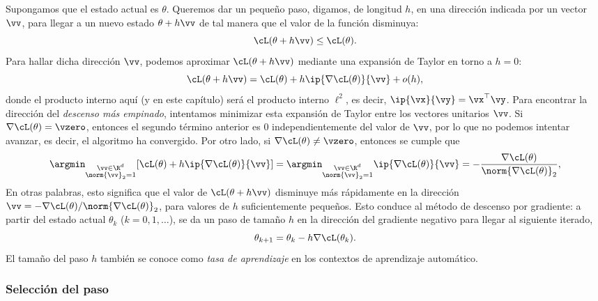\documentclass[../../book-main_es.tex]{subfiles}
\begin{document}
Supongamos que el estado actual es \(\theta\). Queremos dar un pequeño
paso, digamos, de longitud \(h\), en una dirección indicada por un vector
\(\vv\), para llegar a un nuevo estado \(\theta + h\vv\) de tal manera que el valor
de la función disminuya:
\begin{equation}
    \cL(\theta + h\vv) \leq \cL(\theta).
\end{equation}
Para hallar dicha dirección $\vv$, podemos aproximar $\cL(\theta +
h\vv)$ mediante una expansión de Taylor en torno a \(h = 0\):
\begin{equation}
    \cL(\theta + h\vv) = \cL(\theta) + h\ip{\nabla \cL(\theta)}{\vv} + o(h),
\end{equation}
donde el producto interno aquí (y en este capítulo) será el
producto interno \(\ell^{2}\), es decir, \(\ip{\vx}{\vy} = \vx^{\top}\vy\).
Para encontrar la dirección del \textit{descenso más empinado}, intentamos
minimizar esta expansión de Taylor entre los vectores unitarios \(\vv\). Si
\(\nabla \cL(\theta) = \vzero\), entonces el segundo término anterior es \(0\)
independientemente del valor de \(\vv\), por lo que no podemos intentar
avanzar, es decir, el algoritmo ha convergido. Por otro lado, si
\(\nabla \cL(\theta) \neq \vzero\), entonces se cumple que
\begin{equation}\label{eq:steepest_descent_l2_norm}
    \argmin_{\substack{\vv \in \R^{d} \\ \norm{\vv}_{2} = 1}}
    [\cL(\theta) + h\ip{\nabla \cL(\theta)}{\vv}] =
    \argmin_{\substack{\vv \in \R^{d} \\ \norm{\vv}_{2} = 1}}
    \ip{\nabla \cL(\theta)}{\vv} = -\frac{\nabla
    \cL(\theta)}{\norm{\nabla \cL(\theta)}_{2}},
\end{equation}
En otras palabras, esto significa que el valor de \(\cL(\theta + h\vv)\)
disminuye más rápidamente en la dirección \(\vv = -\nabla \cL(\theta)
/ \norm{\nabla \cL(\theta)}_{2}\), para valores de \(h\) suficientemente pequeños. Esto conduce
al método de descenso por gradiente: a partir del estado actual \(\theta_{k}\)
(\(k=0, 1, \ldots\)), se da un paso de tamaño \(h\) en la dirección
del gradiente negativo para llegar al siguiente iterado,
\begin{equation}
    \theta_{k+1} = \theta_{k} - h \nabla \cL(\theta_{k}).
\end{equation}
El tamaño del paso \(h\) también se conoce como \textit{tasa de aprendizaje} en
los contextos de aprendizaje automático.

\subsubsection{Selección del paso}
\end{document}
